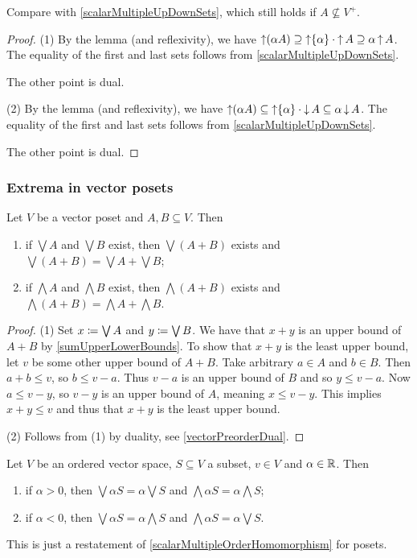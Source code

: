 Compare with \ref{scalarMultipleUpDownSets}, which still holds if $A \nsubseteq V^+$.
\begin{proof}
(1) By the lemma (and reflexivity), we have $\operatorname{\uparrow}(\alpha A) \supseteq \operatorname{\uparrow}\{\alpha\}\cdot \operatorname{\uparrow} A \supseteq \alpha \operatorname{\uparrow} A$. The equality of the first and last sets follows from \ref{scalarMultipleUpDownSets}.

The other point is dual.

(2) By the lemma (and reflexivity), we have $\operatorname{\uparrow}(\alpha A) \subseteq \operatorname{\uparrow}\{\alpha\}\cdot \operatorname{\downarrow} A \subseteq \alpha \operatorname{\downarrow} A$. The equality of the first and last sets follows from \ref{scalarMultipleUpDownSets}.

The other point is dual.
\end{proof}


\subsubsection{Extrema in vector posets}
\begin{lemma} \label{extremaVectorSum}
Let $V$ be a vector poset and $A,B\subseteq V$. Then
\begin{enumerate}
\item if $\bigvee A$ and $\bigvee B$ exist, then $\bigvee(A+B)$ exists and $\bigvee(A+B) = \bigvee A + \bigvee B$;
\item if $\bigwedge A$ and $\bigwedge B$ exist, then $\bigwedge(A+B)$ exists and $\bigwedge(A+B) = \bigwedge A + \bigwedge B$.
\end{enumerate}
\end{lemma}
\begin{proof}
(1) Set $x \coloneqq \bigvee A$ and $y \coloneqq \bigvee B$. We have that $x+y$ is an upper bound of $A+B$ by \ref{sumUpperLowerBounds}. To show that $x+y$ is the least upper bound, let $v$ be some other upper bound of $A+B$. Take arbitrary $a\in A$ and $b\in B$. Then $a+b \leq v$, so $b\leq v-a$. Thus $v-a$ is an upper bound of $B$ and so $y \leq v-a$. Now $a\leq v-y$, so $v-y$ is an upper bound of $A$, meaning $x \leq v-y$. This implies $x+y \leq v$ and thus that $x+y$ is the least upper bound.

(2) Follows from (1) by duality, see \ref{vectorPreorderDual}.
\end{proof}

\begin{lemma} \label{scalarMultipleOrderHomomorphismPoset}
Let $V$ be an ordered vector space, $S\subseteq V$ a subset, $v\in V$ and $\alpha\in \mathbb{R}$. Then
\begin{enumerate}
\item if $\alpha > 0$, then $\bigvee \alpha S = \alpha \bigvee S$ and $\bigwedge \alpha S = \alpha \bigwedge S$;
\item if $\alpha < 0$, then $\bigvee \alpha S = \alpha \bigwedge S$ and $\bigwedge \alpha S = \alpha \bigvee S$.
\end{enumerate}
\end{lemma}
This is just a restatement of \ref{scalarMultipleOrderHomomorphism} for posets.


